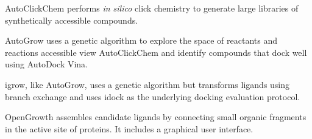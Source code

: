 AutoClickChem \cite{Durrant_2012} performs \textit{in silico} click chemistry to generate large libraries of synthetically accessible compounds.

AutoGrow \cite{Durrant_2013} uses a genetic algorithm to explore the space of reactants and reactions accessible view AutoClickChem and identify compounds that dock well using AutoDock Vina.

igrow, like AutoGrow, uses a genetic algorithm but transforms ligands using branch exchange and uses idock as the underlying docking evaluation protocol.

OpenGrowth  \cite{Ch_ron_2015}  assembles candidate ligands by connecting small organic fragments in the active site of proteins.  It includes a graphical user interface.

